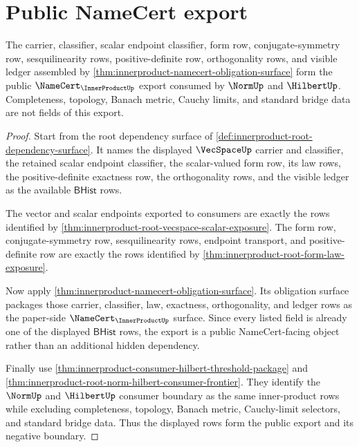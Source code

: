 \section{Public NameCert export}
\label{sec:innerproduct-public-namecert-export}

\begin{theorem}
\label{thm:innerproduct-public-namecert-export}
The carrier, classifier, scalar endpoint classifier, form row,
conjugate-symmetry row, sesquilinearity rows, positive-definite row,
orthogonality rows, and visible ledger assembled by
\autoref{thm:innerproduct-namecert-obligation-surface} form the public
$\NameCert_{\InnerProductUp}$ export consumed by $\NormUp$ and $\HilbertUp$.
Completeness, topology, Banach metric, Cauchy limits, and standard bridge
data are not fields of this export.
\end{theorem}
\begin{proof}
Start from the root dependency surface of
\autoref{def:innerproduct-root-dependency-surface}. It names the displayed
$\VecSpaceUp$ carrier and classifier, the retained scalar endpoint
classifier, the scalar-valued form row, its law rows, the positive-definite
exactness row, the orthogonality rows, and the visible ledger as the
available $\mathsf{BHist}$ rows.

The vector and scalar endpoints exported to consumers are exactly the rows
identified by
\autoref{thm:innerproduct-root-vecspace-scalar-exposure}. The form row,
conjugate-symmetry row, sesquilinearity rows, endpoint transport, and
positive-definite row are exactly the rows identified by
\autoref{thm:innerproduct-root-form-law-exposure}.

Now apply \autoref{thm:innerproduct-namecert-obligation-surface}. Its
obligation surface packages those carrier, classifier, law, exactness,
orthogonality, and ledger rows as the paper-side
$\NameCert_{\InnerProductUp}$ surface. Since every listed field is already
one of the displayed $\mathsf{BHist}$ rows, the export is a public
NameCert-facing object rather than an additional hidden dependency.

Finally use \autoref{thm:innerproduct-consumer-hilbert-threshold-package}
and \autoref{thm:innerproduct-root-norm-hilbert-consumer-frontier}. They
identify the $\NormUp$ and $\HilbertUp$ consumer boundary as the same
inner-product rows while excluding completeness, topology, Banach metric,
Cauchy-limit selectors, and standard bridge data. Thus the displayed rows
form the public export and its negative boundary.
\end{proof}

